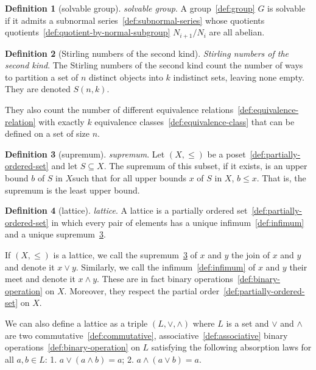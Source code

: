 \documentclass[12pt,a4paper]{article}
\theoremstyle{definition}
\newtheorem{definition}{Definition}
\begin{document}
\begin{definition}[solvable group]\label{def:solvable-group}
\emph{solvable group}. A group~\ref{def:group} $G$ is solvable if it admits a subnormal series~\ref{def:subnormal-series} whose quotients quotients~\ref{def:quotient-by-normal-subgroup} $N_{i+1}/N_i$ are all abelian.
\end{definition}

\begin{definition}[Stirling numbers of the second kind]\label{def:stirling-numbers-of-the-second-kind}
\emph{Stirling numbers of the second kind}. The Stirling numbers of the second kind count the number of ways to partition a set of $n$ distinct objects into $k$ indistinct sets, leaving none empty. They are denoted $S(n,k)$.

They also count the number of different equivalence relations~\ref{def:equivalence-relation} with exactly $k$ equivalence classes~\ref{def:equivalence-class} that can be defined on a set of size $n$.
\end{definition}

\begin{definition}[supremum]\label{def:supremum}
\emph{supremum}. Let $(X,\leq)$ be a poset~\ref{def:partially-ordered-set} and let $S\subseteq X$. The supremum of this subset, if it exists, is an upper bound $b$ of $S$ in $X$such that for all upper bounds $x$ of $S$ in $X$, $b\leq x$. That is, the supremum is the least upper bound.
\end{definition}

\begin{definition}[lattice]\label{def:lattice}
\emph{lattice}. A lattice is a partially ordered set~\ref{def:partially-ordered-set} in which every pair of elements has a unique infimum~\ref{def:infimum} and a unique supremum~\ref{def:supremum}. 

If $(X, \leq)$ is a lattice, we call the supremum~\ref{def:supremum} of $x$ and $y$ the join of $x$ and $y$ and denote it $x\lor y$. Similarly, we call the infimum~\ref{def:infimum} of $x$ and $y$ their meet and denote it $x\land y$. These are in fact binary operations~\ref{def:binary-operation} on $X$. Moreover, they respect the partial order~\ref{def:partially-ordered-set} on $X$.  

We can also define a lattice as a triple $(L, \lor,\land)$ where $L$ is a set and $\lor$ and $\land$ are two commutative~\ref{def:commutative}, associative~\ref{def:associative} binary operations~\ref{def:binary-operation} on $L$ satisfying the following absorption laws for all $a,b \in L$:
1. $a\lor (a\land b) = a$;
2. $a\land (a\lor b) = a$.
\end{definition}
\end{document}
